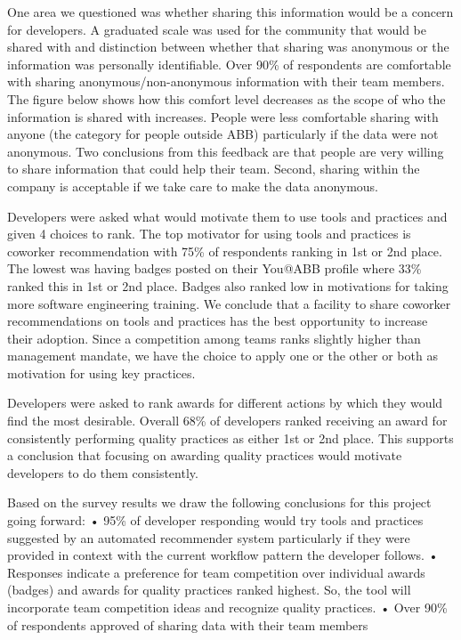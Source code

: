\documentclass{sig-alternate}
\begin{document}
One area we questioned was whether sharing this information would be a concern for developers.  A graduated scale was used for the community that would be shared with and distinction between whether that sharing was anonymous or the information was personally identifiable.  Over 90\% of respondents are comfortable with sharing anonymous/non-anonymous information with their team members.  The figure below shows how this comfort level decreases as the scope of who the information is shared with increases.  People were less comfortable sharing with anyone (the category for people outside ABB) particularly if the data were not anonymous.  
Two conclusions from this feedback are that people are very willing to share information that could help their team. Second, sharing within the company is acceptable if we take care to make the data anonymous.

Developers were asked what would motivate them to use tools and practices and given 4 choices to rank.  The top motivator for using tools and practices is coworker recommendation with 75\% of respondents ranking in 1st or 2nd place.   The lowest was having badges posted on their You@ABB profile where 33\% ranked this in 1st or 2nd place.   Badges also ranked low in motivations for taking more software engineering training.  We conclude that a facility to share coworker recommendations on tools and practices has the best opportunity to increase their adoption.  Since a competition among teams ranks slightly higher than management mandate, we have the choice to apply one or the other or both as motivation for using key practices.  
 
Developers were asked to rank awards for different actions by which they would find the most desirable.  Overall 68\% of developers ranked receiving an award for consistently performing quality practices as either 1st or 2nd place.  This supports a conclusion that focusing on awarding quality practices would motivate developers to do them consistently.
 
Based on the survey results we draw the following conclusions for this project going forward:
•	95\% of developer responding would try tools and practices suggested by an automated recommender system particularly if they were provided in context with the current workflow pattern the developer follows.
•	Responses indicate a preference for team competition over individual awards (badges) and awards for quality practices ranked highest.  So, the tool will incorporate team competition ideas and recognize quality practices.
•	Over 90\% of respondents approved of sharing data with their team members
\end{document}
